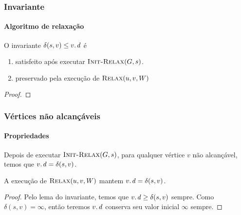 \documentclass{beamer}
\begin{document}
\begin{frame}
\frametitle{Invariante}
\framesubtitle{Algoritmo de relaxação}

\begin{lemma}[Invariante]
O invariante $\delta(s, v) \le \attrib{v}{d}$ é 
\begin{enumerate}
\item satisfeito após executar $\textnormal{\scshape Init-Relax}(G, s)$.
\item preservado pela execução de $\textnormal{\scshape Relax}(u, v, W)$
\end{enumerate}
\end{lemma}
\pause
\begin{proof}
\end{proof}

\end{frame}

\begin{frame}
\frametitle{Vértices não alcançáveis}
\framesubtitle{Propriedades}

\begin{corollary}
Depois de executar $\textnormal{\scshape Init-Relax}(G,s)$, para qualquer vértice $v$ não alcançável, temos que $\attrib{v}{d} = \delta(s, v)$.

A execução de $\textnormal{\scshape Relax}(u, v, W)$ mantem $\attrib{v}{d} = \delta(s, v)$.
\end{corollary}

\begin{proof}
Pelo lema do invariante, temos que $\attrib{v}{d} \ge \delta(s, v)$ sempre.
Como $\delta(s, v) = \infty$, então teremos $\attrib{v}{d}$ conserva seu
valor inicial $\infty$ sempre.
\end{proof}
\end{frame}
\end{document}
